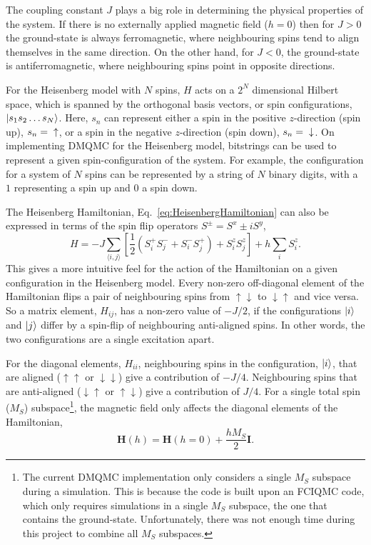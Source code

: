 The coupling constant $J$ plays a big role in determining the physical properties of the system. If there is no externally applied magnetic field ($h=0$) then for $J > 0$ the ground-state is always ferromagnetic, where neighbouring spins tend to align themselves in the same direction. On the other hand, for $J<0$, the ground-state is antiferromagnetic, where neighbouring spins point in opposite directions.

For the Heisenberg model with $N$ spins, $H$ acts on a $2^N$ dimensional Hilbert space, which is spanned by the orthogonal basis vectors, or spin configurations, $\ket{s_1s_2\dots s_N}$. Here, $s_n$ can represent either a spin in the positive $z$-direction (spin up), $s_n = \textnormal{}\uparrow$, or a spin in the negative $z$-direction (spin down), $s_n=\textnormal{}\downarrow$. On implementing DMQMC for the Heisenberg model, bitstrings can be used to represent a given spin-configuration of the system. For example, the configuration for a system of $N$ spins can be represented by a string of $N$ binary digits, with a $1$ representing a spin up and $0$ a spin down. 

The Heisenberg Hamiltonian, Eq.~\ref{eq:HeisenbergHamiltonian} can also be expressed in terms of the spin flip operators $S^{\pm} = S^x \pm i S^y$,
\begin{equation}
H = -J\sum_{\langle i, j \rangle} \left[\frac{1}{2}\left(S^{+}_{i} S^{-}_{j} + S^{-}_{i} S^{+}_{j}\right)+S^z_{i}S^z_{j}\right]+h\sum_{i}S^z_i.
\end{equation}
This gives a more intuitive feel for the action of the Hamiltonian on a given configuration in the Heisenberg model. Every non-zero off-diagonal element of the Hamiltonian flips a pair of neighbouring spins from $\uparrow\downarrow$ to $\downarrow\uparrow$ and vice versa. So a matrix element, $H_{ij}$, has a non-zero value of $-J/2$, if the configurations $\ket{i}$ and $\ket{j}$ differ by a spin-flip of neighbouring anti-aligned spins. In other words, the two configurations are a single excitation apart.

For the diagonal elements, $H_{ii}$, neighbouring spins in the configuration, $\ket{i}$, that are aligned ($\uparrow\uparrow$ or $\downarrow\downarrow$) give a contribution of $-J/4$. Neighbouring spins that are anti-aligned ($\downarrow \uparrow$ or $\uparrow\downarrow$) give a contribution of $J/4$. For a single total spin ($M_S$) subspace\footnote{The current DMQMC implementation only considers a single $M_S$ subspace during a simulation. This is because the code is built upon an FCIQMC code, which only requires simulations in a single $M_S$ subspace, the one that contains the ground-state. Unfortunately, there was not enough time during this project to combine all $M_S$ subspaces.}, the magnetic field only affects the diagonal elements of the Hamiltonian,
\begin{equation}
\label{eq:MagneticHamiltonian}
\bm{H}(h) = \bm{H}(h=0) + \frac{hM_S}{2} \bm{I}.
\end{equation}

